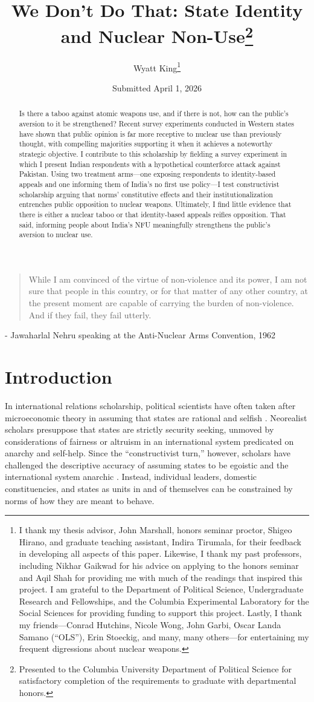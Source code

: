 \documentclass[12pt]{article}
\title{We Don't Do That: State Identity and Nuclear Non-Use\footnote{Presented to the Columbia University Department of Political Science for satisfactory completion of the requirements to graduate with departmental honors.}}
\author{Wyatt King\footnote{I thank my thesis advisor, John Marshall, honors seminar proctor, Shigeo Hirano, and graduate teaching assistant, Indira Tirumala, for their feedback in developing all aspects of this paper. Likewise, I thank my past professors, including Nikhar Gaikwad for his advice on applying to the honors seminar and Aqil Shah for providing me with much of the readings that inspired this project. I am grateful to the Department of Political Science, Undergraduate Research and Fellowships, and the Columbia Experimental Laboratory for the Social Sciences for providing funding to support this project. Lastly, I thank my friends—Conrad Hutchins, Nicole Wong, John Garbi, Oscar Landa Samano (“OLS”), Erin Stoeckig, and many, many others—for entertaining my frequent digressions about nuclear weapons.}}
\date{Submitted April 1, 2026}
\begin{document}
\maketitle
\begin{abstract} 
Is there a taboo against atomic weapons use, and if there is not, how can the public's aversion to it be strengthened? Recent survey experiments conducted in Western states have shown that public opinion is far more receptive to nuclear use than previously thought, with compelling majorities supporting it when it achieves a noteworthy strategic objective. I contribute to this scholarship by fielding a survey experiment in which I present Indian respondents with a hypothetical counterforce attack against Pakistan. Using two treatment arms—one exposing respondents to identity-based appeals and one informing them of India's no first use policy—I test constructivist scholarship arguing that norms' constitutive effects and their institutionalization entrenches public opposition to nuclear weapons. Ultimately, I find little evidence that there is either a nuclear taboo or that identity-based appeals reifies opposition. That said, informing people about India's NFU meaningfully strengthens the public's aversion to nuclear use.

\end{abstract}

\newpage
\doublespacing
\begin{center}
\blockquote{While I am convinced of the virtue of non-violence and its power, I am not sure that people in this country, or for that matter of any other country, at the present moment are capable of carrying the burden of non-violence. And if they fail, they fail utterly.}

- Jawaharlal Nehru speaking at the Anti-Nuclear Arms Convention, 1962
\end{center}

\section{Introduction}
In international relations scholarship, political scientists have often taken after microeconomic theory in assuming that states are rational and selfish \citep{waltz_man_1959}. Neorealist scholars presuppose that states are strictly security seeking, unmoved by considerations of fairness or altruism in an international system predicated on anarchy and self-help. Since the “constructivist turn,” however, scholars have challenged the descriptive accuracy of assuming states to be egoistic and the international system anarchic \citep{wendt_anarchy_1992}. Instead, individual leaders, domestic constituencies, and states as units in and of themselves can be constrained by norms of how they are meant to behave. 
\end{document}
